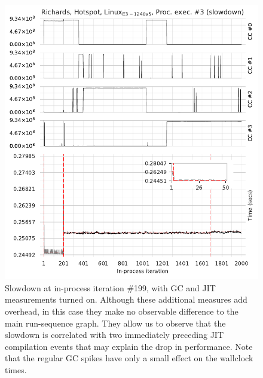 \documentclass[acmlarge]{acmart}\settopmatter{printfolios=true}
\begin{document}
\begin{figure}[!tbp]
\centering
\begin{minipage}[t]{0.485\textwidth}
\includegraphics[width=\textwidth]{examples/new_miscomp.pdf}
\caption{ Slowdown at in-process iteration \#199, with GC and JIT measurements
turned on. Although these additional measures add overhead, in this
case they make no observable difference to the main run-sequence graph. They
allow us to observe that the slowdown is correlated with two immediately preceding JIT compilation events
that may explain the drop in performance. Note that the
regular GC spikes have only a small effect on the wallclock times.}
\label{fig:examples:slowdown1}
\end{minipage}
\hfill
\begin{minipage}[t]{0.485\textwidth}

\end{minipage}
\end{figure}
\end{document}
